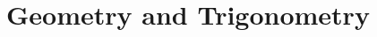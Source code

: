 \documentclass[../satmath.tex]{subfiles}
\begin{document}
\chapter{Geometry and Trigonometry}
\end{document}
